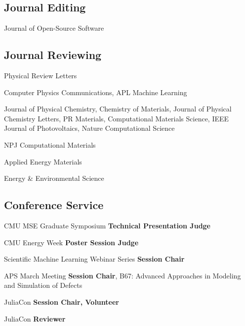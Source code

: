 \subsection{Journal Editing}
{}
{Journal of Open-Source Software}
{}

\vspace{-2mm}
\subsection{Journal Reviewing}

                      {}
                      {Physical Review Letters}
                      {}

{}
{Computer Physics Communications, APL Machine Learning}
{}

{}
{Journal of Physical Chemistry, Chemistry of Materials, Journal of Physical Chemistry Letters, PR Materials, Computational Materials Science, IEEE Journal of Photovoltaics, Nature Computational Science}
{}

{}
{NPJ Computational Materials}
{}

{}
{Applied Energy Materials}
{}

{}
{Energy \& Environmental Science}
{}

\vspace{-2mm}
\subsection{Conference Service}
{CMU MSE Graduate Symposium}
{\textbf{Technical Presentation Judge}}
{}

{CMU Energy Week}
{\textbf{Poster Session Judge}}
{}


{Scientific Machine Learning Webinar Series}
{\textbf{Session Chair}}
{}

{APS March Meeting}
{\textbf{Session Chair}, B67: Advanced Approaches in Modeling and Simulation of Defects}
{}
\vspace{1mm}

{JuliaCon}
{\textbf{Session Chair, Volunteer}}
{}

{JuliaCon}
{\textbf{Reviewer}}
{}

